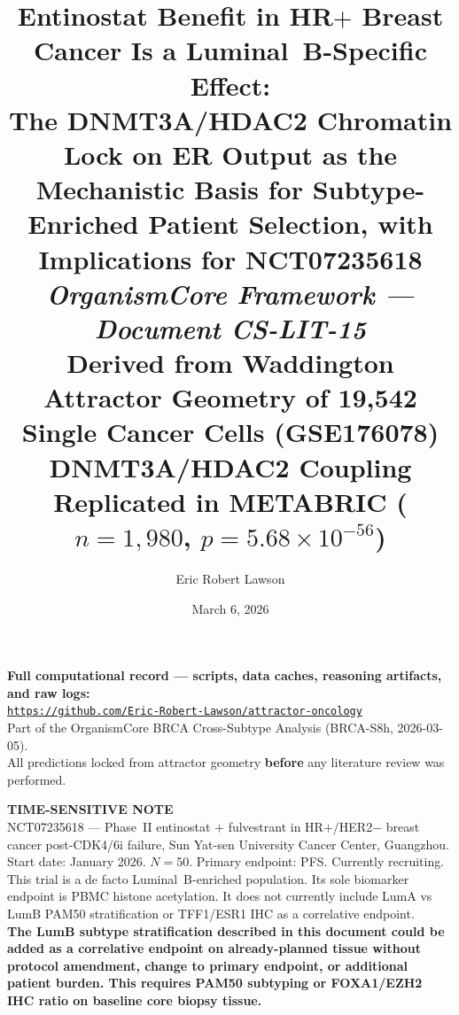 \documentclass[12pt, a4paper]{article}
\title{
    \vspace{-1em}
    \textbf{Entinostat Benefit in HR$+$ Breast Cancer
    Is a Luminal~B-Specific Effect:}\\[0.5em]
    \large The DNMT3A/HDAC2 Chromatin Lock on ER
    Output as the Mechanistic Basis for Subtype-Enriched
    Patient Selection, with Implications for
    NCT07235618\\[0.4em]
    \normalsize \textit{OrganismCore Framework ---
    Document CS-LIT-15}\\[0.3em]
    \small Derived from Waddington Attractor Geometry
    of 19,542 Single Cancer Cells (GSE176078)\\[0.3em]
    \small DNMT3A/HDAC2 Coupling Replicated in METABRIC
    ($n=1{,}980$, $p=5.68\times10^{-56}$)
}
\author[1]{Eric Robert Lawson}
\affil[1]{
    OrganismCore\\
    \href{mailto:OrganismCore@proton.me}
         {OrganismCore@proton.me}\\
    ORCID:
    \href{https://orcid.org/0009-0002-0414-6544}
         {0009-0002-0414-6544}
}
\date{March 6, 2026}
\begin{document}

\maketitle
\thispagestyle{fancy}

\begin{center}
\colorbox{repobox}{
\begin{minipage}{0.88\textwidth}
\vspace{0.5em}
\centering
\textbf{Full computational record --- scripts, data
caches, reasoning artifacts, and raw logs:}\\[0.4em]
\href{https://github.com/Eric-Robert-Lawson/attractor-oncology}
{\texttt{https://github.com/Eric-Robert-Lawson/attractor-oncology}}
\\[0.3em]
\small Part of the OrganismCore BRCA Cross-Subtype
Analysis (BRCA-S8h, 2026-03-05).\\
All predictions locked from attractor geometry
\textbf{before} any literature review was performed.
\vspace{0.5em}
\end{minipage}}
\end{center}

\vspace{0.8em}

\begin{center}
\colorbox{urgentbox}{
\begin{minipage}{0.88\textwidth}
\vspace{0.5em}
\centering
\textbf{TIME-SENSITIVE NOTE}\\[0.4em]
\small
NCT07235618 --- Phase~II entinostat $+$ fulvestrant
in HR$+$/HER2$-$ breast cancer post-CDK4/6i failure,
Sun Yat-sen University Cancer Center, Guangzhou.
Start date: January 2026. $N=50$. Primary endpoint:
PFS. Currently recruiting.\\[0.3em]
This trial is a de facto Luminal~B-enriched
population. Its sole biomarker endpoint is PBMC
histone acetylation. It does not currently include
LumA vs LumB PAM50 stratification or TFF1/ESR1
IHC as a correlative endpoint.\\[0.3em]
\textbf{The LumB subtype stratification described
in this document could be added as a correlative
endpoint on already-planned tissue without
protocol amendment, change to primary endpoint,
or additional patient burden. This requires
PAM50 subtyping or FOXA1/EZH2 IHC ratio
on baseline core biopsy tissue.}
\vspace{0.5em}
\end{minipage}}
\end{center}
\end{document}
